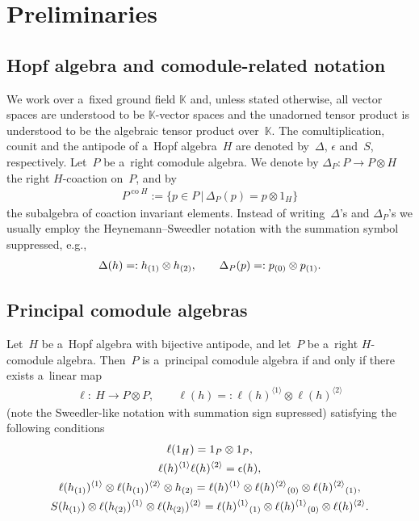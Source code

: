 \documentclass[pdftex]{sigma}
\DeclareMathOperator{\co}{co}
\def\sw#1{{\sb{(#1)}}}
\newcommand{\ls}[1]{\ell(#1)^{\langle 1\rangle}}
\newcommand{\rs}[1]{\ell(#1)^{\langle 2\rangle}}
\begin{document}
\section{Preliminaries}\label{preliminaries}

\subsection{Hopf algebra and comodule-related notation}

We work over a~f\/ixed ground f\/ield $\mathbb{K}$ and, unless stated otherwise, all vector spaces are understood to be
$\mathbb{K}$-vector spaces and the unadorned tensor product is understood to be the algebraic tensor product over~$\mathbb{K}$.
The comultiplication, counit and the antipode of a~Hopf algebra~$H$ are denoted by~$\Delta$, ${\epsilon}$ and~$S$,
respectively.
Let~$P$ be a~right comodule algebra.
We denote by $\Delta_P:P\rightarrow P\otimes H$ the right $H$-coaction on~$P$, and by
\begin{gather*}
P^{\co H}:=\big\{p\in P
\,|\,
\Delta_P(p)=p\otimes 1_H\big\}
\end{gather*}
the subalgebra of coaction invariant elements.
Instead of writing~$\Delta$'s and $\Delta_P$'s we usually employ the Heynemann--Sweedler notation with the summation
symbol suppressed, e.g.,
\begin{gather*}
\Delta(h)=:h\sw{1}\otimes h\sw{2},
\qquad
\Delta_P(p)=:p\sw{0}\otimes p\sw{1}.
\end{gather*}

\subsection{Principal comodule algebras}

Let~$H$ be a~Hopf algebra with bijective antipode, and let~$P$ be a~right $H$-comodule algebra.
Then~$P$ is a~principal comodule algebra if and only if there exists a~linear map
\begin{gather*}
\ell: \ H\rightarrow P\otimes P,
\qquad
\ell(h)=:\ls{h}\otimes\rs{h}
\end{gather*}
(note the Sweedler-like notation with summation sign supressed) satisfying the following conditions
\begin{subequations}
\label{el-prop}
\begin{gather}
\ell(1_H)=1_P\otimes1_P,
\label{el-unitality}
\\
\ls{h}\rs{h}={\epsilon}(h),
\label{el-collapse}
\\
\ls{h\sw{1}}\otimes\rs{h\sw{1}}\otimes h\sw{2}=\ls{h}\otimes\rs{h}\sw{0}\otimes\rs{h}\sw{1},
\label{el-rcolinear}
\\
S(h\sw{1})\otimes\ls{h\sw{2}}\otimes\rs{h\sw{2}}=\ls{h}\sw{1}\otimes\ls{h}\sw{0}\otimes\rs{h}.
\label{el-lcolinear}
\end{gather}
\end{subequations}
\end{document}
